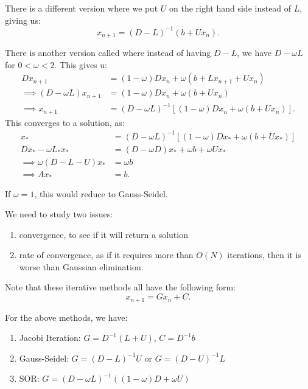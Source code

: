 \documentclass[../main/main.tex]{subfiles}
\begin{document}
\begin{remark}
    There is a different version where we put $U$ on the right hand side instead of $L$, giving us:  \[
        x_{n+1} = (D-L)^{-1} (b+Ux_n)
    .\] 
\end{remark}

There is another version called  where instead of having $D-L$, we have $D-\omega L$ for  $0 < \omega < 2$. This gives u: 
\begin{align*}
    Dx_{n+1} &=  (1-\omega)D x_n + \omega(b+L x_{n+1} + Ux_n) \\
    \implies (D-\omega L)x_{n+1} &= (1-\omega) D x_n + \omega(b+Ux_n) \\
   \implies x_{n+1} &= (D-\omega L)^{-1}\left[ (1-\omega)Dx_n + \omega (b+Ux_n) \right] 
.\end{align*}
This converges to a solution, as: 
\begin{align*}
    x_{*} &= (D-\omega L)^{-1}\left[ (1-\omega)Dx_* + \omega (b+Ux_*) \right] \\
    Dx_{*} - \omega L_* x_* &= (D-\omega D) x_{*} + \omega b + \omega Ux_{*} \\
    \implies \omega(D-L-U) x_* &=\omega b \\
    \implies A x_* &= b 
.\end{align*}

\begin{remark}
    If $\omega = 1$,  this would reduce to Gauss-Seidel.
\end{remark}
We need to study two issues: 
\begin{enumerate}
    \item convergence, to see if it will return a solution
    \item rate of convergence, as if it requires more than $O(N)$ iterations, then it is worse than Gaussian elimination.
\end{enumerate}

Note that these iterative methods all have the following form: \[
x_{n+1} = Gx_n + C
.\]  

\begin{example}
    For the above methods, we have:
    \begin{enumerate}
        \item Jacobi Iteration: $G = D^{-1}(L+U)$, $C = D^{-1}b$
        \item Gauss-Seidel: $G = (D-L)^{-1}U$ or $ G = (D-U)^{-1} L$
        \item SOR: $G= (D-\omega L)^{-1}((1-\omega)D + \omega U)$
    \end{enumerate}
\end{example}
\end{document}
